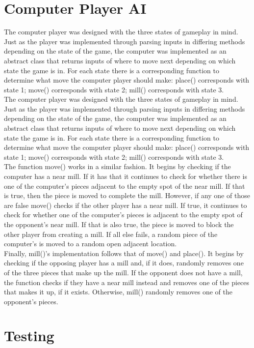 \documentclass[12pt]{article}
\begin{document}
	\section{Computer Player AI}	
	\indent The computer player was designed with the three states of gameplay in mind. Just as the player was implemented through parsing inputs in differing methods depending on the state of the game, the computer was implemented as an abstract class that returns inputs of where to move next depending on which state the game is in. For each state there is a corresponding function to determine what move the computer player should make: place() corresponds with state 1; move() corresponds with state 2; mill() corresponds with state 3.\\
	The computer player was designed with the three states of gameplay in mind. Just as the player was implemented through parsing inputs in differing methods depending on the state of the game, the computer was implemented as an abstract class that returns inputs of where to move next depending on which state the game is in. For each state there is a corresponding function to determine what move the computer player should make: place() corresponds with state 1; move() corresponds with state 2; mill() corresponds with state 3.\\
	The function move() works in a similar fashion. It begins by checking if the computer has a near mill. If it has that it continues to check for whether there is one of the computer’s pieces adjacent to the empty spot of the near mill. If that is true, then the piece is moved to complete the mill. However, if any one of those are false move() checks if the other player has a near mill. If true, it continues to check for whether one of the computer’s pieces is adjacent to the empty spot of the opponent’s near mill. If that is also true, the piece is moved to block the other player from creating a mill. If all else fails, a random piece of the computer’s is moved to a random open adjacent location.\\
	Finally, mill()’s implementation follows that of move() and place(). It begins by checking if the opposing player has a mill and, if it does, randomly removes one of the three pieces that make up the mill. If the opponent does not have a mill, the function checks if they have a near mill instead and removes one of the pieces that makes it up, if it exists. Otherwise, mill() randomly removes one of the opponent’s pieces.\\
	\section{Testing}
	
\end{document}
